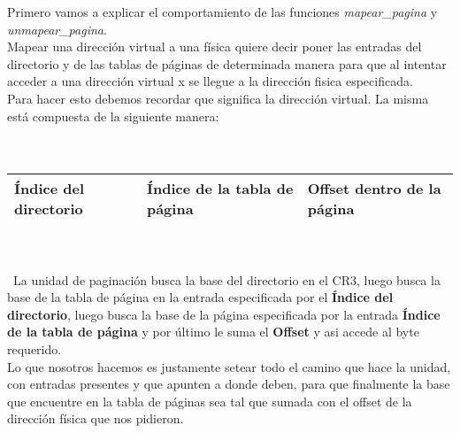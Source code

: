 Primero vamos a explicar el comportamiento de las funciones \textit{mapear\_pagina} y \textit{unmapear\_pagina}.\\
Mapear una dirección virtual a una física quiere decir poner las entradas del directorio y de las tablas de páginas de determinada manera para que al intentar acceder a una dirección virtual x se llegue a la dirección fisica especificada.\\
Para hacer esto debemos recordar que significa la dirección virtual. La misma está compuesta de la siguiente manera:
\\ \\\
\begin{tabular}{|l|l|l|}
\hline
\textbf{Índice del directorio} & \textbf{Índice de la tabla de página} & \textbf{Offset dentro de la página}\\
\hline
\end{tabular}
\\ \\\
La unidad de paginación busca la base del directorio en el CR3, luego busca la base de la tabla de página en la entrada especificada por el \textbf{Índice del directorio}, luego busca la base de la página especificada por la entrada \textbf{Índice de la tabla de página} y por último le suma el \textbf{Offset} y asi accede al byte requerido.\\
Lo que nosotros hacemos es justamente setear todo el camino que hace la unidad, con entradas presentes y que apunten a donde deben, para que finalmente la base que encuentre en la tabla de páginas sea tal que sumada con el offset de la dirección física que nos pidieron.\\\ \\

